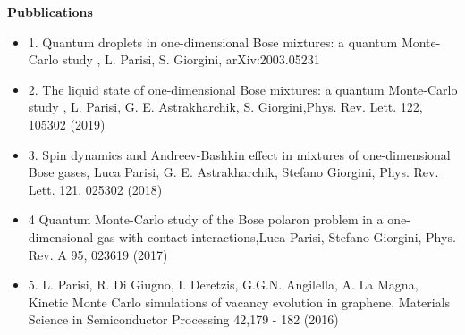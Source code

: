 \documentclass[11pt,a4paper,sans]{article}
\begin{document}
 \textbf{ Pubblications}


\begin{itemize}

\item{}{1. Quantum droplets in one-dimensional Bose mixtures: a quantum Monte-Carlo study ,  L. Parisi, S. Giorgini, arXiv:2003.05231}

  
\item{}{2. The liquid state of one-dimensional Bose mixtures: a quantum Monte-Carlo study ,  L. Parisi, G. E. Astrakharchik, S. Giorgini,Phys. Rev. Lett. 122, 105302 (2019)}
\item{}{3. Spin dynamics and Andreev-Bashkin effect in mixtures of one-dimensional Bose gases,  Luca Parisi, G. E. Astrakharchik, Stefano Giorgini, Phys. Rev. Lett. 121, 025302 (2018)}

\item{}{4 Quantum Monte-Carlo study of the Bose polaron problem in a one-dimensional gas with contact interactions,Luca Parisi, Stefano Giorgini, Phys. Rev. A 95, 023619 (2017)
}
\item{}{5. L. Parisi, R. Di Giugno, I. Deretzis, G.G.N. Angilella, A. La Magna, Kinetic Monte Carlo simulations of vacancy evolution in graphene, Materials Science in Semiconductor Processing 42,179 - 182 (2016) }
\end{itemize}
\end{document}
